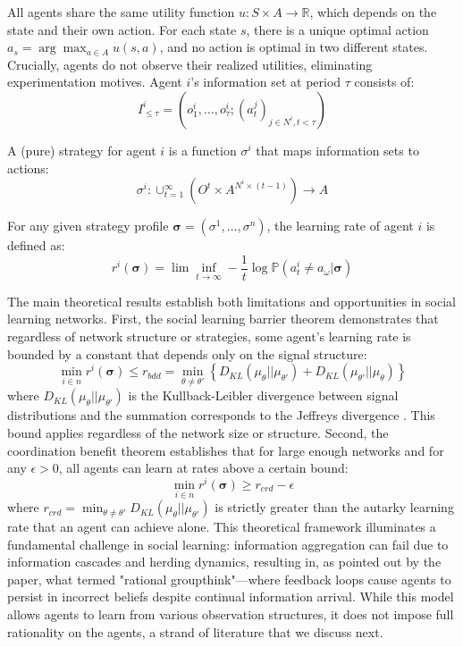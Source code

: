\documentclass[a4paper,12pt]{report}
\begin{document}
All agents share the same utility function $u: S \times A \rightarrow \mathbb{R}$, which depends on the state and their own action. For each state $s$, there is a unique optimal action $a_{s} = \arg\max_{a \in A} u(s, a)$, and no action is optimal in two different states. Crucially, agents do not observe their realized utilities, eliminating experimentation motives. Agent $i$'s information set at period $\tau$ consists of:
\begin{equation*}
    I^i_{\leq \tau} = (o^i_1, \ldots, o^i_{\tau}; (a^j_t)_{j \in N^i, t < \tau})
\end{equation*}

A (pure) strategy for agent $i$ is a function $\sigma^i$ that maps information sets to actions:
\begin{equation*}
    \sigma^i: \cup_{t=1}^{\infty} (O^t \times A^{N^i \times (t-1)}) \rightarrow A
\end{equation*}

For any given strategy profile $\boldsymbol{\sigma} = (\sigma^1, \ldots, \sigma^n)$, the learning rate of agent $i$ is defined as:
\begin{equation*}
    r^i(\boldsymbol{\sigma}) = \lim\inf_{t\rightarrow\infty} -\frac{1}{t}\log \mathbb{P}(a^i_t \neq a_{\omega} | \boldsymbol{\sigma})
\end{equation*}

The main theoretical results establish both limitations and opportunities in social learning networks. First, the social learning barrier theorem demonstrates that regardless of network structure or strategies, some agent's learning rate is bounded by a constant that depends only on the signal structure:
\begin{equation*}
    \min_{i \in n} r^i(\boldsymbol{\sigma}) \leq r_{bdd} = \min_{\theta \neq \theta'} \left\{D_{KL}(\mu_{\theta} || \mu_{\theta'}) + D_{KL}(\mu_{\theta'} || \mu_{\theta})\right\}
\end{equation*}
where $D_{KL}(\mu_{\theta} || \mu_{\theta'})$ is the Kullback-Leibler divergence between signal distributions and the summation corresponds to the Jeffreys divergence \citet{52862b84-7c34-3186-8b28-6af4806272c3}. This bound applies regardless of the network size or structure. Second, the coordination benefit theorem establishes that for large enough networks and for any $\epsilon > 0$, all agents can learn at rates above a certain bound:
\begin{equation*}
    \min_{i \in n} r^i(\boldsymbol{\sigma}) \geq r_{crd} - \epsilon
\end{equation*}
where $r_{crd} = \min_{\theta \neq \theta'} D_{KL}(\mu_{\theta} || \mu_{\theta'})$ is strictly greater than the autarky learning rate that an agent can achieve alone. This theoretical framework illuminates a fundamental challenge in social learning: information aggregation can fail due to information cascades and herding dynamics, resulting in, as pointed out by the paper, what \citet{harel2021rational} termed "rational groupthink"—where feedback loops cause agents to persist in incorrect beliefs despite continual information arrival. While this model allows agents to learn from various observation structures, it does not impose full rationality on the agents, a strand of literature that we discuss next.
\end{document}
